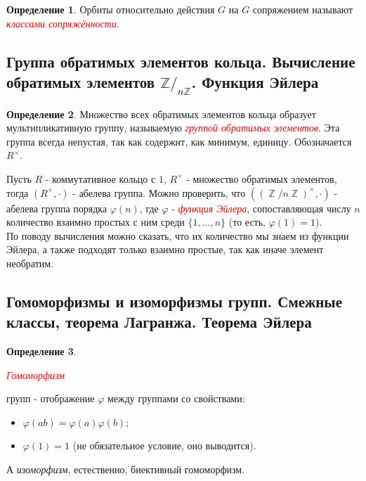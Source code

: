 \documentclass[a4paper,100pt]{article}
\theoremstyle{indented}
\theoremstyle{definition}
\newtheorem{defn}{Определение}
\theoremstyle{remark}
\DeclareMathOperator{\ZZ}{\mathbb{Z}}
\begin{document}
\begin{defn}
    Орбиты относительно действия $G$ на $G$ сопряжением называют \hypertarget{n83}{\textcolor{red}{\textit{классами сопряжённости}}}.
\end{defn}

\resetall

\subsection{Группа обратимых элементов кольца. Вычисление обратимых элементов $\mathbb{Z}/_{n\mathbb{Z}}$. Функция Эйлера}

\begin{defn}
    Множество всех обратимых элементов кольца образует мультипликативную группу, называемую \hypertarget{n84}{\textcolor{red}{\textit{группой обратимых элементов}}}. Эта группа всегда непустая, так как содержит, как минимум, единицу. Обозначается $R^\times$.
\end{defn}

Пусть $R$ - коммутативное кольцо с $1$, $R^{\times}$ - множество обратимых элементов, тогда $(R^\times, \cdot)$ - абелева группа. Можно проверить, что $((\ZZ /n \ZZ)^{\times}, \cdot)$ - абелева группа порядка $\varphi(n)$, где $\varphi$ - \hypertarget{n85}{\textcolor{red}{\textit{функция Эйлера}}}, сопоставляющая числу $n$ количество взаимно простых с ним среди $\{1, \dots, n\}$ (то есть, $\varphi(1)=1$).\\

По поводу вычисления можно сказать, что их количество мы знаем из функции Эйлера, а также подходят только взаимно простые, так как иначе элемент необратим.

\resetall

\subsection{Гомоморфизмы и изоморфизмы групп. Смежные классы, теорема Лагранжа. Теорема Эйлера}

\begin{defn}
    \hypertarget{n86}{\textcolor{red}{\textit{Гомоморфизм}}} групп - отображение $\varphi$ между группами со свойствами:\ 

    \begin{itemize}
        \item $\varphi(ab)=\varphi(a)\varphi(b)$;
        \item $\varphi(1)=1$ (не обязательное условие, оно выводится).
    \end{itemize}

    А \textit{изоморфизм}, естественно, биективный гомоморфизм.
\end{defn}
\end{document}
